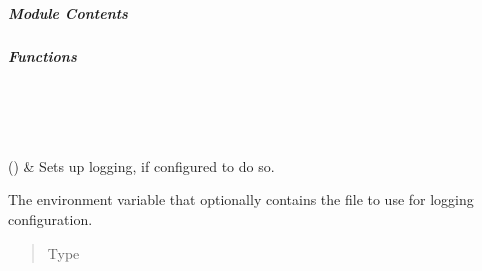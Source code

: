 \documentclass[letterpaper,10pt,english]{sphinxmanual}
\begin{document}
\subparagraph{Module Contents}
\label{\detokenize{autoapi/pine/client/log/index:module-contents}}

\subparagraph{Functions}
\label{\detokenize{autoapi/pine/client/log/index:functions}}

\begin{savenotes}\sphinxatlongtablestart\begin{longtable}[c]{}
\hline

\endfirsthead

%
{}\\
\hline

\endhead

\hline
{}\\
\endfoot

\endlastfoot

\sphinxAtStartPar
{\hyperref[\detokenize{autoapi/pine/client/log/index:pine.client.log.setup_logging}]{}}()
&
\sphinxAtStartPar
Sets up logging, if configured to do so.
\\
\hline
\end{longtable}\sphinxatlongtableend\end{savenotes}

\begin{fulllineitems}
\label{\detokenize{autoapi/pine/client/log/index:pine.client.log.CONFIG_FILE_ENV}}
\sphinxAtStartPar
The environment variable that optionally contains the file to use for logging configuration.
\begin{quote}\begin{description}
\item[{Type}] \leavevmode
\sphinxAtStartPar
{}

\end{description}\end{quote}

\end{fulllineitems}
\end{document}
